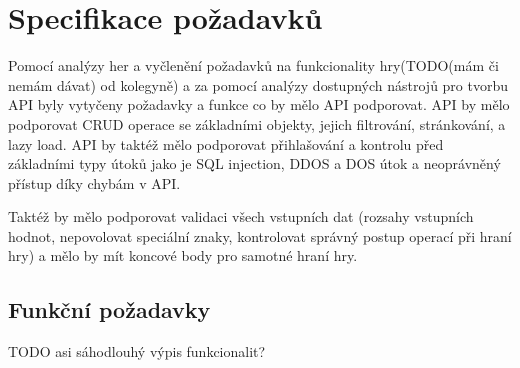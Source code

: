 \section[short]{Specifikace požadavků}
Pomocí analýzy her a vyčlenění požadavků na funkcionality hry(TODO(mám či nemám dávat) od kolegyně) a za pomocí analýzy dostupných nástrojů pro tvorbu API byly vytyčeny požadavky a funkce co by mělo API podporovat. API by mělo podporovat CRUD operace se základními objekty, jejich filtrování, stránkování, a lazy load. API by taktéž mělo podporovat přihlašování a kontrolu před základními typy útoků jako je SQL injection, DDOS a DOS útok a neoprávněný přístup díky chybám v API.

Taktéž by mělo podporovat validaci všech vstupních dat (rozsahy vstupních hodnot, nepovolovat speciální znaky, kontrolovat správný postup operací při hraní hry) a mělo by mít koncové body pro samotné hraní hry.

\subsection{Funkční požadavky}
TODO asi sáhodlouhý výpis funkcionalit?


